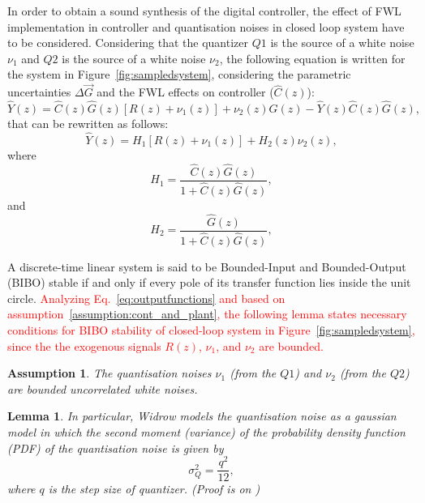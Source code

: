 \documentclass{sig-alternate-05-2015}
\newtheorem{myassumption}{Assumption}
\newtheorem{mylemma}{Lemma}
\begin{document}
In order to obtain a sound synthesis of the digital controller, the effect of FWL implementation in controller and quantisation noises in closed loop system have to be considered. Considering that the quantizer $Q1$ is the source of a white noise $\nu_{1}$ and $Q2$ is the source of a white noise $\nu_{2}$, the following equation is written for the system in Figure~\ref{fig:sampledsystem}, considering the parametric uncertainties $\Delta \vec{G}$ and the FWL effects on controller ($\hat{C}(z)$):
\begin{equation}
\hat{Y}(z)=\hat{C}(z)\hat{G}(z)[R(z)+\nu_{1}(z)]+\nu_{2}(z)\hat{G}(z)-\hat{Y}(z)\hat{C}(z)\hat{G}(z),
\end{equation}
that can be rewritten as follows:
\begin{equation}
\label{eq:outputfunctions}
\hat{Y}(z)=H_{1}[R(z)+\nu_{1}(z)]+H_{2}(z)\nu_{2}(z),
\end{equation}
where
\begin{equation}
H_{1}=\frac{\hat{C}(z)\hat{G}(z)}{1+\hat{C}(z)\hat{G}(z)},
\end{equation}
and
\begin{equation}
H_{2}=\frac{\hat{G}(z)}{1+\hat{C}(z)\hat{G}(z)},
\end{equation}

A discrete-time linear system is said to be Bounded-Input and Bounded-Output (BIBO) stable if and only if every pole of its transfer function lies inside the unit circle. \textcolor{red}{Analyzing Eq.~\eqref{eq:outputfunctions} and based on assumption~\ref{assumption:cont_and_plant}, the following lemma states necessary conditions for BIBO stability of closed-loop system in Figure~\ref{fig:sampledsystem}, since the the exogenous signals $R(z)$, $\nu_{1}$, and $\nu_{2}$ are bounded.}

\begin{myassumption}
\label{whitenoise}
%
The quantisation noises $\nu_{1}$ (from the $Q1$) and $\nu_{2}$ (from the
$Q2$) are bounded uncorrelated white noises.
% 
\end{myassumption}

\begin{mylemma}
\label{lemma:variance}
In particular, Widrow \cite{widrow1956} models the quantisation noise as a gaussian
model in which the second moment (variance) of the probability density
function (PDF) of the quantisation noise is given by
%
\begin{equation}
\label{eq:variancelemma}
\sigma_{Q}^{2}=\frac{q^{2}}{12},
\end{equation}
where $q$ is the step size of quantizer. (Proof is on \cite{widrow1956})
\end{mylemma}
\end{document}
